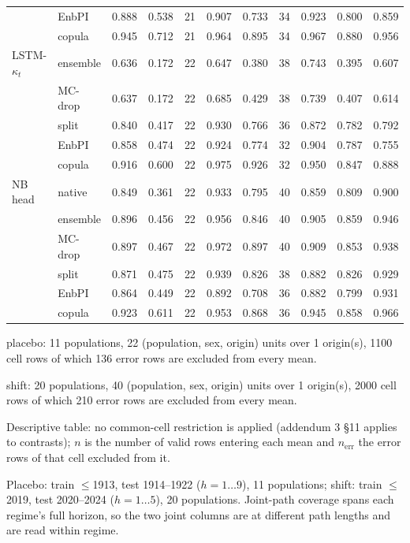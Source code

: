 \begin{threeparttable}
\begin{tabular}{@{}llrrrrrrrrr@{}}
 & EnbPI & 0.888 & 0.538 & 21 & 0.907 & 0.733 & 34 & 0.923 & 0.800 & 0.859 \\
 & copula & 0.945 & 0.712 & 21 & 0.964 & 0.895 & 34 & 0.967 & 0.880 & 0.956 \\
\addlinespace[1pt]
LSTM-$\kappa_t$ & ensemble & 0.636 & 0.172 & 22 & 0.647 & 0.380 & 38 & 0.743 & 0.395 & 0.607 \\
 & MC-drop & 0.637 & 0.172 & 22 & 0.685 & 0.429 & 38 & 0.739 & 0.407 & 0.614 \\
 & split & 0.840 & 0.417 & 22 & 0.930 & 0.766 & 36 & 0.872 & 0.782 & 0.792 \\
 & EnbPI & 0.858 & 0.474 & 22 & 0.924 & 0.774 & 32 & 0.904 & 0.787 & 0.755 \\
 & copula & 0.916 & 0.600 & 22 & 0.975 & 0.926 & 32 & 0.950 & 0.847 & 0.888 \\
\addlinespace[1pt]
NB head & native & 0.849 & 0.361 & 22 & 0.933 & 0.795 & 40 & 0.859 & 0.809 & 0.900 \\
 & ensemble & 0.896 & 0.456 & 22 & 0.956 & 0.846 & 40 & 0.905 & 0.859 & 0.946 \\
 & MC-drop & 0.897 & 0.467 & 22 & 0.972 & 0.897 & 40 & 0.909 & 0.853 & 0.938 \\
 & split & 0.871 & 0.475 & 22 & 0.939 & 0.826 & 38 & 0.882 & 0.826 & 0.929 \\
 & EnbPI & 0.864 & 0.449 & 22 & 0.892 & 0.708 & 36 & 0.882 & 0.799 & 0.931 \\
 & copula & 0.923 & 0.611 & 22 & 0.953 & 0.868 & 36 & 0.945 & 0.858 & 0.966 \\
\bottomrule
\end{tabular}
\begin{tablenotes}\scriptsize
\item placebo: 11 populations, 22 (population, sex, origin) units over 1 origin(s), 1100 cell rows of which 136 error rows are excluded from every mean.
\item shift: 20 populations, 40 (population, sex, origin) units over 1 origin(s), 2000 cell rows of which 210 error rows are excluded from every mean.
\item Descriptive table: no common-cell restriction is applied (addendum 3 \S11 applies to contrasts); $n$ is the number of valid rows entering each mean and $n_{\mathrm{err}}$ the error rows of that cell excluded from it.
\item Placebo: train $\le$1913, test 1914--1922 ($h=1\ldots9$), 11 populations; shift: train $\le$2019, test 2020--2024 ($h=1\ldots5$), 20 populations. Joint-path coverage spans each regime's full horizon, so the two joint columns are at different path lengths and are read within regime.

\end{tablenotes}
\end{threeparttable}
